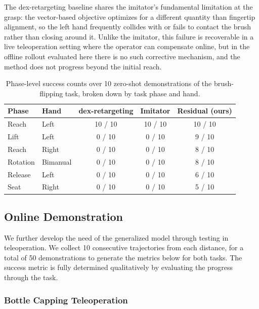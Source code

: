 The dex-retargeting baseline shares the imitator's fundamental limitation at the grasp: the vector-based objective optimizes for a different quantity than fingertip alignment, so the left hand frequently collides with or fails to contact the brush rather than closing around it. Unlike the imitator, this failure is recoverable in a live teleoperation setting where the operator can compensate online, but in the offline rollout evaluated here there is no such corrective mechanism, and the method does not progress beyond the initial reach.

\begin{table}[H]
    \centering
    \begin{tabular}{llccc}
        \toprule
        \textbf{Phase} & \textbf{Hand} & \textbf{dex-retargeting} & \textbf{Imitator} & \textbf{Residual (ours)} \\
        \midrule
        Reach    & Left     & 10 / 10 & 10 / 10 & 10 / 10 \\
        Lift     & Left     &  0 / 10 &  0 / 10 &  9 / 10 \\
        Reach    & Right    &  0 / 10 &  0 / 10 &  8 / 10 \\
        Rotation & Bimanual &  0 / 10 &  0 / 10 &  8 / 10 \\
        Release  & Left     &  0 / 10 &  0 / 10 &  6 / 10 \\
        Seat     & Right    &  0 / 10 &  0 / 10 &  5 / 10 \\
        \bottomrule
    \end{tabular}
    \caption{Phase-level success counts over 10 zero-shot demonstrations of the
             brush-flipping task, broken down by task phase and hand.}
    \label{tab:brush_task_breakdown}
\end{table}

\subsection{Online Demonstration}
\label{online_demonstration}

We further develop the need of the generalized model through testing in teleoperation. We collect 10 consecutive trajectories from each distance, for a total of 50 demonstrations to generate the metrics below for both tasks. The success metric is fully determined qualitatively by evaluating the progress through the task.

\subsubsection{Bottle Capping Teleoperation}

